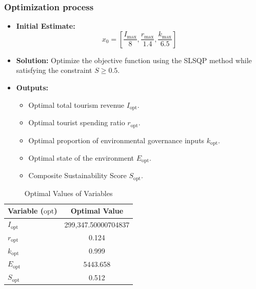 \documentclass[UTF8]{mcmthesis}
\begin{document}
        \subsubsection{Optimization process}

        \begin{itemize}
            \item \textbf{Initial Estimate:} 
            \[
            x_0 = \left[ \frac{I_{\text{max}}}{8}, \frac{r_{\text{max}}}{1.4}, \frac{k_{\text{max}}}{6.5} \right]
            \]
            \item \textbf{Solution:} Optimize the objective function using the SLSQP method while satisfying the constraint \( S \geq 0.5 \).
            \item \textbf{Outputs:}
            \begin{itemize}
                \item Optimal total tourism revenue  \( I_{\text{opt}} \).
                \item Optimal tourist spending ratio \( r_{\text{opt}} \).
                \item Optimal proportion of environmental governance inputs \( k_{\text{opt}} \).
                \item Optimal state of the environment \( E_{\text{opt}} \).
                \item Composite Sustainability Score \( S_{\text{opt}} \).
            \end{itemize}
        \end{itemize}
        
        \begin{table}[htbp]
            \centering
            \caption{Optimal Values of Variables}
            \begin{tabular}{lc}
                \toprule
                \textbf{Variable (\( \text{opt} \))} & \textbf{Optimal Value} \\
                \midrule
                \( I_{\text{opt}} \) & 299,347.50000704837 \\
                \( r_{\text{opt}} \) & 0.124 \\
                \( k_{\text{opt}} \) & 0.999 \\
                \( E_{\text{opt}} \) & 5443.658 \\
                \( S_{\text{opt}} \) & 0.512 \\
                \bottomrule
            \end{tabular}
            \label{tab:optimal_values}
        \end{table}
        
\end{document}
